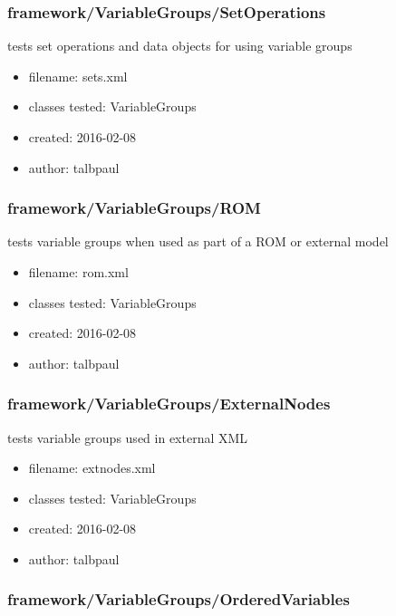     \subsubsection{framework/VariableGroups/SetOperations}
      
      tests set operations and data objects for using variable groups
    
      \begin{itemize}
          \item filename: sets.xml
          \item classes tested: VariableGroups
          \item created: 2016-02-08
          \item author: talbpaul
      \end{itemize}
    \subsubsection{framework/VariableGroups/ROM}
      
      tests variable groups when used as part of a ROM or external model
    
      \begin{itemize}
          \item filename: rom.xml
          \item classes tested: VariableGroups
          \item created: 2016-02-08
          \item author: talbpaul
      \end{itemize}
    \subsubsection{framework/VariableGroups/ExternalNodes}
      
      tests variable groups used in external XML
    
      \begin{itemize}
          \item filename: extnodes.xml
          \item classes tested: VariableGroups
          \item created: 2016-02-08
          \item author: talbpaul
      \end{itemize}
    \subsubsection{framework/VariableGroups/OrderedVariables}
      
